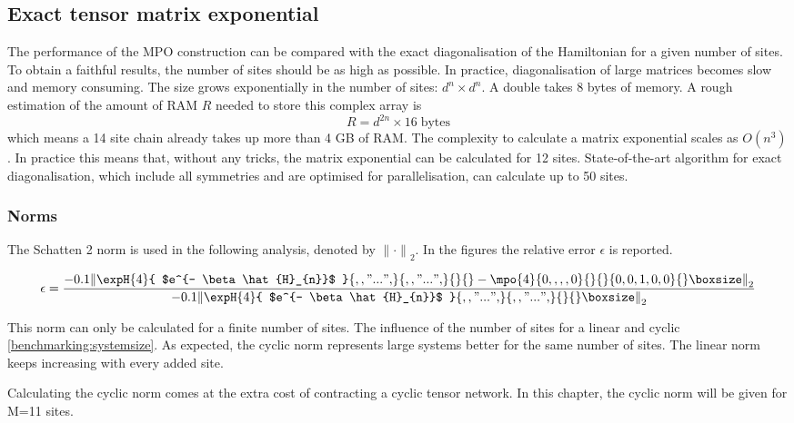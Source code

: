 
\subsection{Exact tensor matrix exponential } \label{chap_bench}

The performance of the MPO construction can be compared with the exact diagonalisation of the Hamiltonian for a given number of sites. To obtain a faithful results, the number of sites should be as high as possible. In practice, diagonalisation of large matrices becomes slow and memory consuming. The size grows exponentially in the number of sites: $d^{n} \times d^{n} $. A double takes 8 bytes of memory. A rough estimation of the amount of RAM $R$ needed to store this complex array is
\begin{equation}
    R = d^{2 n} \times 16 \; \text{bytes}
\end{equation}
which means a 14 site chain already takes up more than 4 GB of RAM. The complexity to calculate a matrix exponential scales as $O(n^3)$ \cite{Moler2003}. In practice this means that, without any tricks, the matrix exponential can be calculated for 12 sites.  State-of-the-art algorithm for exact diagonalisation, which include all symmetries and are optimised for parallelisation, can calculate up to 50 sites. \cite{Wietek2018}

\subsubsection{Norms} \label{mponormdef}
\def \expHBlock {\expH{4}{ $e^{- \beta \hat{H}_{n}}$   }{ {,,"...",} }{ {,,"...",} }{}{} }
\def \Mn {\mpo{4}{ {0,,,,0}  }{}{}{{0,0,1,0,0}}{}}

The Schatten 2 norm is used in the following analysis, denoted by ${\| \cdot \|} _{2}$. In the figures the relative error $\epsilon$ is reported.

\begin{equation}
    \epsilon = \frac{  {  \left \|  \expHBlock - \Mn  \right \|} _{2}  }{ {  \left\|  \expHBlock \right \|}_2}
\end{equation}

This norm can only be calculated for a finite number of sites. The influence of the number of sites for a linear  and cyclic \cref{benchmarking:systemsize}. As expected, the cyclic norm represents large systems better for the same number of sites. The linear norm keeps increasing with every added site.

Calculating the cyclic norm comes at the extra cost of contracting a cyclic tensor network. In this chapter, the cyclic norm will be given for M=11 sites.


